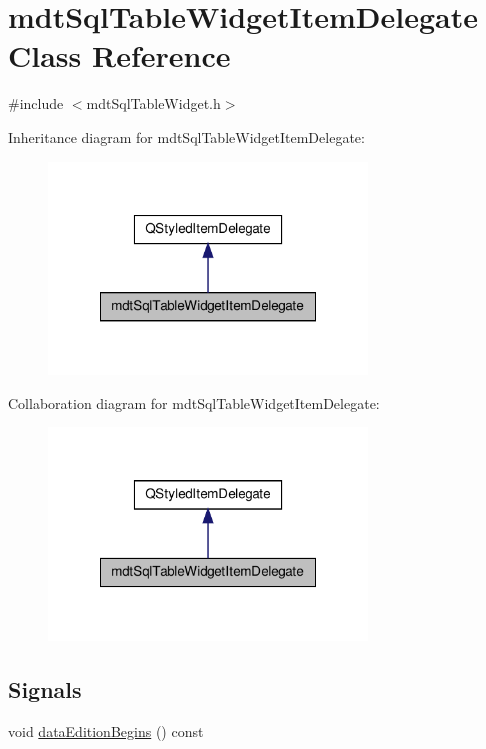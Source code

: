 \hypertarget{classmdt_sql_table_widget_item_delegate}{\section{mdt\-Sql\-Table\-Widget\-Item\-Delegate Class Reference}
\label{classmdt_sql_table_widget_item_delegate}
}


{\ttfamily \#include $<$mdt\-Sql\-Table\-Widget.\-h$>$}



Inheritance diagram for mdt\-Sql\-Table\-Widget\-Item\-Delegate\-:\nopagebreak
\begin{figure}[H]
\begin{center}
\leavevmode
\includegraphics[width=240pt]{classmdt_sql_table_widget_item_delegate__inherit__graph}
\end{center}
\end{figure}


Collaboration diagram for mdt\-Sql\-Table\-Widget\-Item\-Delegate\-:\nopagebreak
\begin{figure}[H]
\begin{center}
\leavevmode
\includegraphics[width=240pt]{classmdt_sql_table_widget_item_delegate__coll__graph}
\end{center}
\end{figure}
\subsection*{Signals}
\begin{DoxyCompactItemize}
\item 
void \hyperlink{classmdt_sql_table_widget_item_delegate_af2fdf7d0a1ead61dccdb047240e96643}{data\-Edition\-Begins} () const 
\end{DoxyCompactItemize}
